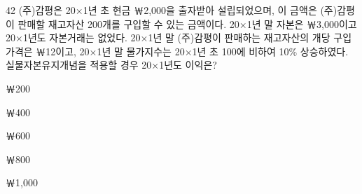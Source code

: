\begin{question}{42}
(주)감평은 20×1년 초 현금 ￦2,000을 출자받아 설립되었으며, 이 금액은 (주)감평이 판매할 재고자산 200개를 구입할 수 있는 금액이다. 20×1년 말 자본은 ￦3,000이고 20×1년도 자본거래는 없었다. 20×1년 말 (주)감평이 판매하는 재고자산의 개당 구입가격은 ￦12이고, 20×1년 말 물가지수는 20×1년 초 100에 비하여 10\% 상승하였다. 실물자본유지개념을 적용할 경우 20×1년도 이익은?
\begin{choices}
  \item ￦200
  \item ￦400
  \item ￦600
  \item ￦800
  \item ￦1,000
\end{choices}
\end{question}
